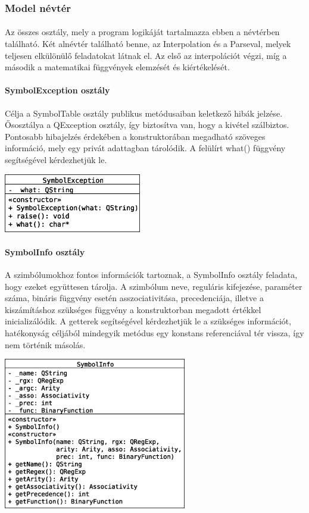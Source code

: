 \documentclass[12pt]{report}
\begin{document}
\subsubsection{Model névtér}
\paragraph{}
Az összes osztály, mely a program logikáját tartalmazza ebben a névtérben található. Két alnévtér található benne, az Interpolation és a Parseval, melyek teljesen elkülönülő feladatokat látnak el. Az első az interpolációt végzi, míg a második a matematikai függvények elemzését és kiértékelését.

\paragraph{SymbolException osztály}
Célja a SymbolTable osztály publikus metódusaiban keletkező hibák jelzése. Ősosztálya a QException osztály, így biztosítva van, hogy a kivétel szálbiztos. Pontosabb hibajelzés érdekében a konstruktorában megadható szöveges információ, mely egy privát adattagban tárolódik. A felülírt what() függvény segítségével kérdezhetjük le.
\begin{center}
\includegraphics[width=6cm]{pics/uml/SymbolException}
\end{center}

\paragraph{SymbolInfo osztály}
A szimbólumokhoz fontos információk tartoznak, a SymbolInfo osztály feladata, hogy ezeket együttesen tárolja. A szimbólum neve, reguláris kifejezése, paraméter száma, bináris függvény esetén asszociativitása, precedenciája, illetve a kiszámításhoz szükséges függvény a konstruktorban megadott értékkel inicializálódik. A getterek segítségével kérdezhetjük le a szükséges információt, hatékonyság céljából mindegyik metódus egy konstans referenciával tér vissza, így nem történik másolás.
\begin{center}
\includegraphics[width=8cm]{pics/uml/SymbolInfo}
\end{center}
\end{document}

